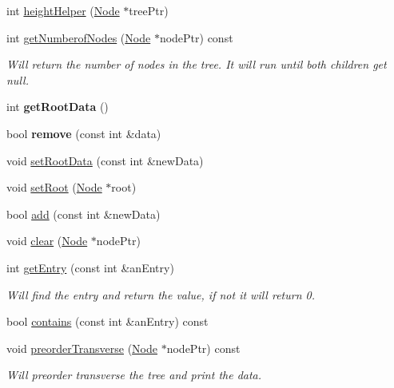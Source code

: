 \begin{DoxyCompactItemize}
int \mbox{\hyperlink{class_node_tree_a504b5d012ccee99b85642d699396dd8f}{height\+Helper}} (\mbox{\hyperlink{class_node}{Node}} $\ast$tree\+Ptr)
\item 
int \mbox{\hyperlink{class_node_tree_ab619ff00f2cd2362d393ad41f2844129}{get\+Numberof\+Nodes}} (\mbox{\hyperlink{class_node}{Node}} $\ast$node\+Ptr) const
\begin{DoxyCompactList}\small\item\em Will return the number of nodes in the tree. It will run until both children get null. \end{DoxyCompactList}\item 
\mbox{\label{class_node_tree_a037b369c78e107b423090eab320b022f}} 
int {\bfseries get\+Root\+Data} ()
\item 
\mbox{\label{class_node_tree_aa1a0aebabeac588fe08b3fb810fe74ba}} 
bool {\bfseries remove} (const int \&data)
\item 
void \mbox{\hyperlink{class_node_tree_aa354f6975e4e1123b47a21948d00e1b2}{set\+Root\+Data}} (const int \&new\+Data)
\item 
void \mbox{\hyperlink{class_node_tree_adfa34cb3970d7ea5ed4c7861ee844b1e}{set\+Root}} (\mbox{\hyperlink{class_node}{Node}} $\ast$root)
\item 
bool \mbox{\hyperlink{class_node_tree_a2e2cd480e0a50d94d26b09cfd721ac7a}{add}} (const int \&new\+Data)
\item 
void \mbox{\hyperlink{class_node_tree_a22be831083f6970a7ba6b64fcd0995ff}{clear}} (\mbox{\hyperlink{class_node}{Node}} $\ast$node\+Ptr)
\item 
int \mbox{\hyperlink{class_node_tree_a28bcd072ea53a04712a792b6b427371c}{get\+Entry}} (const int \&an\+Entry)
\begin{DoxyCompactList}\small\item\em Will find the entry and return the value, if not it will return 0. \end{DoxyCompactList}\item 
bool \mbox{\hyperlink{class_node_tree_a7a0617d6f4b39f495da71613a05a098e}{contains}} (const int \&an\+Entry) const
\item 
void \mbox{\hyperlink{class_node_tree_a73bd5a18b76a3741fcf49e0465622de2}{preorder\+Transverse}} (\mbox{\hyperlink{class_node}{Node}} $\ast$node\+Ptr) const
\begin{DoxyCompactList}\small\item\em Will preorder transverse the tree and print the data. \end{DoxyCompactList}\item 

\end{DoxyCompactItemize}
